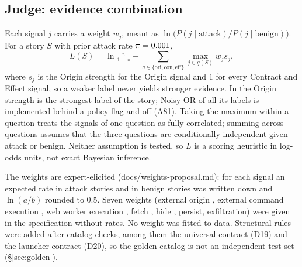 \documentclass[10pt,twocolumn,letterpaper]{article}
\begin{document}
\subsection{Judge: evidence combination}
\label{sec:judge}
Each signal $j$ carries a weight $w_j$, meant as $\ln\bigl(P(j\mid\text{attack})/P(j\mid\text{benign})\bigr)$.
For a story $S$ with prior attack rate $\pi = 0.001$,
\begin{equation}
  L(S) = \ln\tfrac{\pi}{1-\pi} + \sum_{q \in \{\text{ori},\text{con},\text{eff}\}} \max_{j \in q(S)} w_j s_j ,
  \label{eq:logodds}
\end{equation}
where $s_j$ is the Origin strength for the Origin signal and $1$ for every Contract and Effect
signal, so a weaker label never yields stronger evidence. In \Version{} the Origin strength is the
strongest label of the story; Noisy-OR of all its labels is implemented behind a policy flag and
off (A81). Taking the maximum within a question treats the signals of one question as fully
correlated; summing across questions assumes that the three questions are conditionally
independent given attack or benign. Neither assumption is tested, so $L$ is a scoring heuristic in
log-odds units, not exact Bayesian inference.

The \Weights{} weights are expert-elicited (docs/weights-proposal.md): for each signal an
expected rate in attack stories and in benign stories was written down and $\ln(a/b)$ rounded to
0.5. Seven weights (external origin \WOrigin, external command execution \WExtExec, web worker
execution \WWebWorkerExec, fetch \WFetch, hide \WHide, persist, exfiltration) were given in the
specification without rates. No weight was fitted to data. Structural rules were added after
catalog checks, among them the universal contract (D19) and the launcher contract (D20), so the
golden catalog is not an independent test set (\S\ref{sec:golden}).
\end{document}
